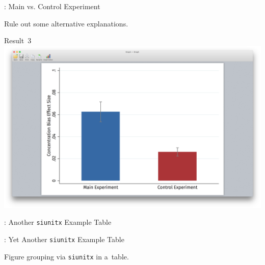 \begin{frame}{\titleprefix: Main vs. Control Experiment}

	Rule out some alternative explanations.
	
	\bigskip
	
	\centering
	{\small \alert{Result~3}} \\[15pt]
	\includegraphics[height=0.5\textheight, trim={3.75in 1.75in 3.75in 2in}, clip]
		{1_Example_Content/Images/average_main_control.png}

\end{frame}


\begin{frame}{\titleprefix: Another \texttt{siunitx} Example Table}

	\begin{table}
	\caption{%
		Example of a~regression table \citep[adapted from][]{Gerhardt2017}.
		Never forget to mention the dependent variable!%
	}
	\label{tab:lin_reg_interactions}
	\resizebox*{!}{0.59\textheight}{%
		\mdseries\selectfont
		
	}
	\end{table}

\end{frame}


\begin{frame}{\titleprefix: Yet Another \texttt{siunitx} Example Table}

	\begin{table}
		\caption{Figure grouping via \texttt{siunitx} in a~table.}
		
	\end{table}

\end{frame}


